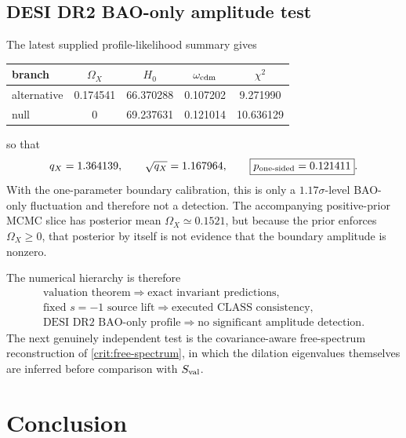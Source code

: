 \documentclass[aps,prd,preprint,onecolumn,nofootinbib,superscriptaddress,showkeys]{revtex4-2}
\numberwithin{equation}{section}
\theoremstyle{definition}
\theoremstyle{plain}
\begin{document}
\subsection{DESI DR2 BAO-only amplitude test}

The latest supplied profile-likelihood summary gives
\begin{center}
\begin{tabular}{@{}lcccc@{}}
\toprule
branch & \(\Omega_X\) & \(H_0\) & \(\omega_{\rm cdm}\) & \(\chi^2\) \\
\midrule
alternative & 0.174541 & 66.370288 & 0.107202 & 9.271990 \\
null & 0 & 69.237631 & 0.121014 & 10.636129 \\
\bottomrule
\end{tabular}
\end{center}
so that
\begin{equation}
q_X=1.364139,
\qquad
\sqrt{q_X}=1.167964,
\qquad
\boxed{p_{\rm one\text{-}sided}=0.121411}.
\end{equation}
With the one-parameter boundary calibration, this is only a \(1.17\sigma\)-level BAO-only fluctuation and therefore not a detection.  The accompanying positive-prior MCMC slice has posterior mean \(\Omega_X\simeq0.1521\), but because the prior enforces \(\Omega_X\ge0\), that posterior by itself is not evidence that the boundary amplitude is nonzero.

The numerical hierarchy is therefore
\begin{equation}
\boxed{
\begin{gathered}
\text{valuation theorem}\Longrightarrow\text{exact invariant predictions},\\
\text{fixed }s=-1\text{ source lift}\Longrightarrow\text{executed CLASS consistency},\\
\text{DESI DR2 BAO-only profile}\Longrightarrow\text{no significant amplitude detection}.
\end{gathered}}
\end{equation}
The next genuinely independent test is the covariance-aware free-spectrum reconstruction of \cref{crit:free-spectrum}, in which the dilation eigenvalues themselves are inferred before comparison with \(S_{\rm val}\).


\section{Conclusion}
\end{document}
